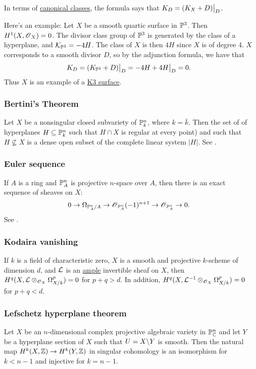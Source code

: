 \documentclass[11pt, english]{article}
\begin{document}
In terms of \hyperref[canonicaldivisor]{canonical classes}, the formula says that $K_D = \restr{(K_X + D)}{D}$. 

Here's an example: Let $X$ be a smooth quartic surface in $\mathbb{P}^3$. Then $H^1(X,\operatorname{\mathscr{O}}_X)=0$. The divisor class group of $\mathbb{P}^3$ is generated by the class of a hyperplane, and $\mathcal K_{\mathbb{P}^3}=-4H$. The class of $X$ is then $4H$ since $X$ is of degree $4$. $X$ corresponds to a smooth divisor $D$, so by the adjunction formula, we have that
\[
K_D = \restr{(K_{\PP^3}+D)}{D} = \restr{-4H+4H}{D} = 0.
\]
Thus $X$ is an example of a \hyperref[k3]{K3 surface}. 


\subsubsection{Bertini's Theorem}
\label{bertini}
Let $X$ be a nonsingular closed subvariety of $\mathbb{P}_k^n$, where $k=\bar k$. Then the set of of hyperplanes $H \subseteq \mathbb{P}_k^n$ such that $H \cap X$ is regular at every point) and such that $H\not  \subseteq X$ is a dense open subset of the complete linear system $|H|$. See \cite[Thm II.8.18]{hartshorne}.

\subsubsection{Euler sequence}
\label{eulersequence}
If $A$ is a ring and $\mathbb{P}_A^n$ is projective $n$-space over $A$, then there is an exact sequence of sheaves on $X$:
\[
0 \to \Omega_{\mathbb{P}^n_A/A} \to \operatorname{\mathscr{O}}_{\mathbb{P}^n_A}(-1)^{n+1} \to \operatorname{\mathscr{O}}_{\mathbb{P}_A^n} \to 0.
\]
See \cite[Thm II.8.13]{hartshorne}.

\subsubsection{Kodaira vanishing}
\label{kodairavanishing}
If $k$ is a field of characteristic zero, $X$ is a smooth and projective $k$-scheme of dimension $d$, and $\mathcal{L}$ is an \hyperref[amplelinebundle]{ample} invertible sheaf on $X$, then ${H^q(X,{\mathcal{L} \otimes_{\operatorname{\mathscr{O}}_X} \Omega^p_{X/k}})=0}$ for $p+q > d$. In addition, $H^q(X,\mathcal{L}^{-1} \otimes_{\operatorname{\mathscr{O}}_X} \Omega_{X/k}^p)=0$ for $p+q < d$. 

\subsubsection{Lefschetz hyperplane theorem}
\label{lefschetz} 
Let $X$ be an $n$-dimensional complex projective algebraic variety in $\mathbb{P}_{\mathbb{C}}^n$ and let $Y$ be a hyperplane section of $X$ such that $U=X \backslash Y$ is smooth. Then the natural map $H^k(X,\mathbb{Z}) \to H^k(Y,\mathbb{Z})$ in singular cohomology is an isomorphism for $k<n-1$ and injective for $k=n-1$.
\end{document}
